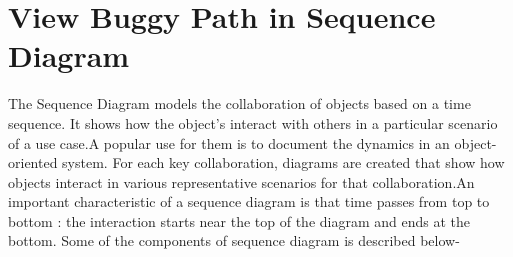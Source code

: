 \section{View Buggy Path in Sequence Diagram}

The Sequence Diagram models the collaboration of objects based on a time sequence. It shows how the object's interact with others in a particular scenario of a use case.A popular use for them is to document the dynamics in an object-oriented system. For each key collaboration, diagrams are created that show how objects interact in various representative scenarios for that collaboration.An important characteristic of a sequence diagram is that time passes from top to bottom : the interaction starts near the top of the diagram and ends at the bottom. Some of the components of sequence diagram \cite{ref_107_visual-paradigm:visual-paradigm} is described below-

